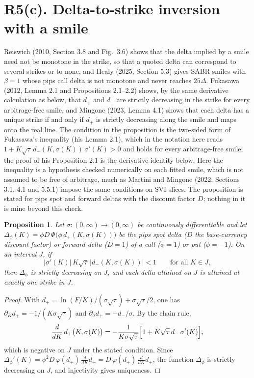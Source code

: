 \documentclass[11pt]{article}
\newtheorem{proposition}{Proposition}
\theoremstyle{remark}
\begin{document}
\section*{R5(c). Delta-to-strike inversion with a smile}

Reiswich (2010, Section 3.8 and Fig.~3.6) shows that the delta implied by a smile need not be monotone in the strike, so that a quoted delta can correspond to several strikes or to none, and Healy (2025, Section 5.3) gives SABR smiles with $\beta=1$ whose pips call delta is not monotone and never reaches $25\Delta$. Fukasawa (2012, Lemma 2.1 and Propositions 2.1--2.2) shows, by the same derivative calculation as below, that $d_+$ and $d_-$ are strictly decreasing in the strike for every arbitrage-free smile, and Mingone (2023, Lemma 4.1) shows that each delta has a unique strike if and only if $d_+$ is strictly decreasing along the smile and maps onto the real line. The condition in the proposition is the two-sided form of Fukasawa's inequality (his Lemma 2.1), which in the notation here reads $1+K\sqrt\tau\,d_-(K,\sigma(K))\,\sigma'(K)>0$ and holds for every arbitrage-free smile; the proof of his Proposition 2.1 is the derivative identity below. Here the inequality is a hypothesis checked numerically on each fitted smile, which is not assumed to be free of arbitrage, much as Martini and Mingone (2022, Sections 3.1, 4.1 and 5.5.1) impose the same conditions on SVI slices. The proposition is stated for pips spot and forward deltas with the discount factor $D$; nothing in it is mine beyond this check.

\begin{proposition}
Let $\sigma:(0,\infty)\to(0,\infty)$ be continuously differentiable and let $\Delta_\phi(K)=\phi D\,\Phi\bigl(\phi\,d_+(K,\sigma(K))\bigr)$ be the pips spot delta ($D$ the base-currency discount factor) or forward delta ($D=1$) of a call ($\phi=1$) or put ($\phi=-1$). On an interval $J$, if
\[
|\sigma'(K)|\,K\sqrt\tau\,|d_-(K,\sigma(K))|<1\qquad\text{for all }K\in J,
\]
then $\Delta_\phi$ is strictly decreasing on $J$, and each delta attained on $J$ is attained at exactly one strike in $J$.
\end{proposition}

\begin{proof}
With $d_+=\ln(F/K)/(\sigma\sqrt\tau)+\sigma\sqrt\tau/2$, one has $\partial_Kd_+=-1/(K\sigma\sqrt\tau)$ and $\partial_\sigma d_+=-d_-/\sigma$. By the chain rule,
\[
\frac{d}{dK}\,d_+\bigl(K,\sigma(K)\bigr)=-\frac{1}{K\sigma\sqrt\tau}\Bigl[1+K\sqrt\tau\,d_-\,\sigma'(K)\Bigr],
\]
which is negative on $J$ under the stated condition. Since $\Delta_\phi'(K)=\phi^2D\,\varphi(d_+)\,\frac{d}{dK}d_+=D\,\varphi(d_+)\,\frac{d}{dK}d_+$, the function $\Delta_\phi$ is strictly decreasing on $J$, and injectivity gives uniqueness.
\end{proof}
\end{document}
